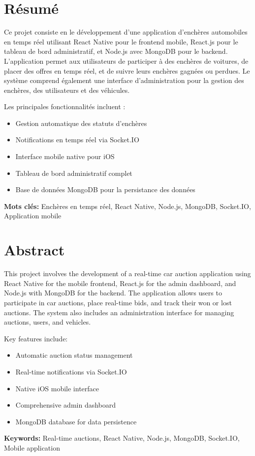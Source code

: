 \chapter*{Résumé}
Ce projet consiste en le développement d'une application d'enchères automobiles en temps réel utilisant React Native pour le frontend mobile, React.js pour le tableau de bord administratif, et Node.js avec MongoDB pour le backend. L'application permet aux utilisateurs de participer à des enchères de voitures, de placer des offres en temps réel, et de suivre leurs enchères gagnées ou perdues. Le système comprend également une interface d'administration pour la gestion des enchères, des utilisateurs et des véhicules.

Les principales fonctionnalités incluent :
\begin{itemize}
    \item Gestion automatique des statuts d'enchères
    \item Notifications en temps réel via Socket.IO
    \item Interface mobile native pour iOS
    \item Tableau de bord administratif complet
    \item Base de données MongoDB pour la persistance des données
\end{itemize}

\vspace{0.5cm}
\textbf{Mots clés:} Enchères en temps réel, React Native, Node.js, MongoDB, Socket.IO, Application mobile

\chapter*{Abstract}
This project involves the development of a real-time car auction application using React Native for the mobile frontend, React.js for the admin dashboard, and Node.js with MongoDB for the backend. The application allows users to participate in car auctions, place real-time bids, and track their won or lost auctions. The system also includes an administration interface for managing auctions, users, and vehicles.

Key features include:
\begin{itemize}
    \item Automatic auction status management
    \item Real-time notifications via Socket.IO
    \item Native iOS mobile interface
    \item Comprehensive admin dashboard
    \item MongoDB database for data persistence
\end{itemize}

\vspace{0.5cm}
\textbf{Keywords:} Real-time auctions, React Native, Node.js, MongoDB, Socket.IO, Mobile application 